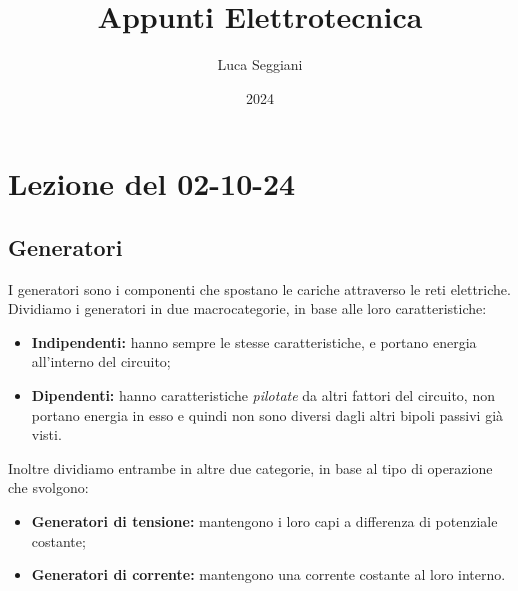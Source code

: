 \documentclass[a4paper,11pt]{article}
\title{Appunti Elettrotecnica}
\author{Luca Seggiani}
\date{2024}
\begin{document}
\section{Lezione del 02-10-24}

\thispagestyle{empty}
\pagestyle{fancy}

\subsection{Generatori}
I generatori sono i componenti che spostano le cariche attraverso le reti elettriche.
Dividiamo i generatori in due macrocategorie, in base alle loro caratteristiche:
\begin{itemize}
	\item \textbf{Indipendenti:} hanno sempre le stesse caratteristiche, e portano energia all'interno del circuito;
	\item \textbf{Dipendenti:} hanno caratteristiche \textit{pilotate} da altri fattori del circuito, non portano energia in esso e quindi non sono diversi dagli altri bipoli passivi già visti.
\end{itemize}

Inoltre dividiamo entrambe in altre due categorie, in base al tipo di operazione che svolgono:
\begin{itemize}
	\item \textbf{Generatori di tensione:} mantengono i loro capi a differenza di potenziale costante;
	\item \textbf{Generatori di corrente:} mantengono una corrente costante al loro interno.
\end{itemize}
\end{document}
